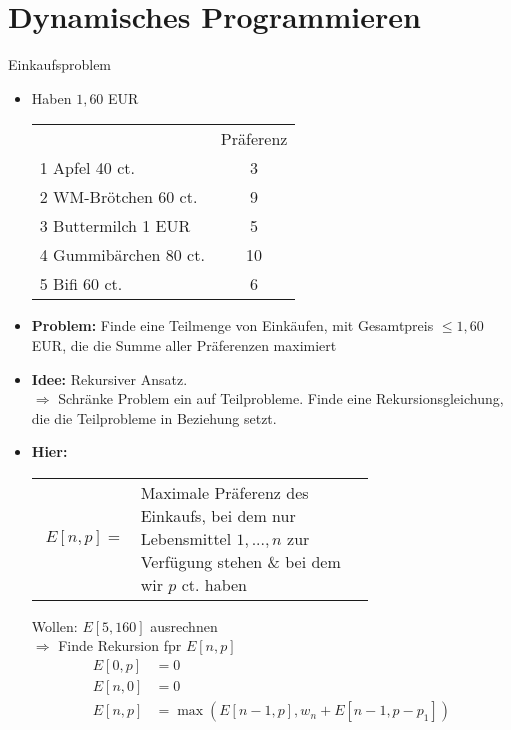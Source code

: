 \section{Dynamisches Programmieren}
\Bsp Einkaufsproblem
\begin{itemize}
 \item Haben $1{,}60$ EUR
        \begin{center}
            \begin{tabular}{l|c}
                & Präferenz \\
                1 Apfel 40 ct. & 3 \\
                2 WM-Brötchen 60 ct. & 9 \\
                3 Buttermilch 1 EUR & 5 \\
                4 Gummibärchen 80 ct. & 10 \\
                5 Bifi 60 ct. & 6 \\ 
            \end{tabular}
        \end{center}
 \item \textbf{Problem:} Finde eine Teilmenge von Einkäufen, mit Gesamtpreis $\leq 1{,}60$ EUR, die die Summe aller Präferenzen maximiert
 \item \textbf{Idee:} Rekursiver Ansatz. \\
    $\Rightarrow$ Schränke Problem ein auf Teilprobleme. Finde eine Rekursionsgleichung, die die Teilprobleme in Beziehung setzt.
 \item \textbf{Hier:}
   \begin{center}
    \begin{tabular}{rp{0.7\linewidth}}
     $E[n,p] =$ & Maximale Präferenz des Einkaufs, bei dem nur Lebensmittel $1,...,n$ zur Verfügung stehen \& bei dem wir $p$ ct. haben
    \end{tabular}
   \end{center}
    Wollen: $E[5,160]$ ausrechnen\\
    $\Rightarrow$ Finde Rekursion fpr $E[n,p]$
    \begin{align*}
     E[0,p] &= 0 \tag*{f. n. P.}\\
     E[n,0] &= 0 \tag*{f. a. n.}\\
     E[n,p] &= \max(E[n-1,p], w_n + E[n-1, p-p_1])
    \end{align*}

\end{itemize}
